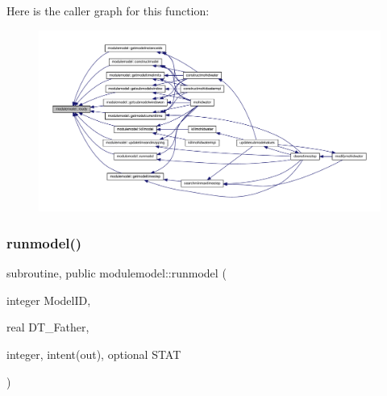 Here is the caller graph for this function\+:\nopagebreak
\begin{figure}[H]
\begin{center}
\leavevmode
\includegraphics[width=350pt]{namespacemodulemodel_af5d93bbd065add89f5cd52475a40e7fc_icgraph}
\end{center}
\end{figure}
\mbox{\label{namespacemodulemodel_a16a07d5b28a4877790acec46aed111b6}} 
\subsubsection{\texorpdfstring{runmodel()}{runmodel()}}
{\footnotesize\ttfamily subroutine, public modulemodel\+::runmodel (\begin{DoxyParamCaption}\item[{integer}]{Model\+ID,  }\item[{real}]{D\+T\+\_\+\+Father,  }\item[{integer, intent(out), optional}]{S\+T\+AT }\end{DoxyParamCaption})}

